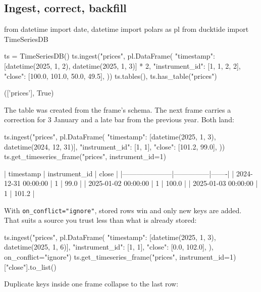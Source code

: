 \documentclass[11pt,a4paper]{article}
\newcommand{\code}[1]{\texttt{#1}}
\begin{document}
\subsection{Ingest, correct, backfill}

\begin{python}
from datetime import date, datetime
import polars as pl
from ducktide import TimeSeriesDB

ts = TimeSeriesDB()
ts.ingest("prices", pl.DataFrame({
    "timestamp": [datetime(2025, 1, 2), datetime(2025, 1, 3)] * 2,
    "instrument_id": [1, 1, 2, 2],
    "close": [100.0, 101.0, 50.0, 49.5],
}))
ts.tables(), ts.has_table("prices")
\end{python}
\begin{console}
(['prices'], True)
\end{console}

The table was created from the frame's schema. The next frame carries a correction for
3 January and a late bar from the previous year. Both land:

\begin{python}
ts.ingest("prices", pl.DataFrame({
    "timestamp": [datetime(2025, 1, 3), datetime(2024, 12, 31)],
    "instrument_id": [1, 1],
    "close": [101.2, 99.0],
}))
ts.get_timeseries_frame("prices", instrument_id=1)
\end{python}
\begin{console}
| timestamp           | instrument_id | close |
|---------------------|---------------|-------|
| 2024-12-31 00:00:00 | 1             | 99.0  |
| 2025-01-02 00:00:00 | 1             | 100.0 |
| 2025-01-03 00:00:00 | 1             | 101.2 |
\end{console}

With \code{on\_conflict="ignore"}, stored rows win and only new keys are added. That suits
a source you trust less than what is already stored:

\begin{python}
ts.ingest("prices", pl.DataFrame({
    "timestamp": [datetime(2025, 1, 3), datetime(2025, 1, 6)],
    "instrument_id": [1, 1],
    "close": [0.0, 102.0],
}), on_conflict="ignore")
ts.get_timeseries_frame("prices", instrument_id=1)["close"].to_list()
\end{python}
\begin{console}
[99.0, 100.0, 101.2, 102.0]
\end{console}

Duplicate keys inside one frame collapse to the last row:
\end{document}
